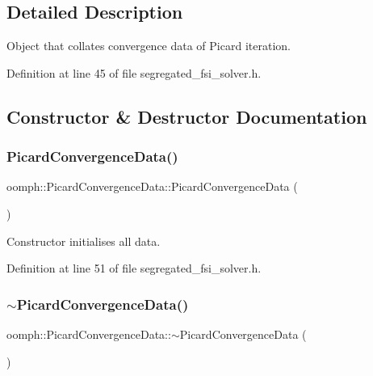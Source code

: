 \subsection{Detailed Description}
Object that collates convergence data of Picard iteration. 

Definition at line 45 of file segregated\+\_\+fsi\+\_\+solver.\+h.



\subsection{Constructor \& Destructor Documentation}
\mbox{\label{classoomph_1_1PicardConvergenceData_a48c244adc14b7d4d741f9083f277f779}} 
\subsubsection{\texorpdfstring{Picard\+Convergence\+Data()}{PicardConvergenceData()}}
{\footnotesize\ttfamily oomph\+::\+Picard\+Convergence\+Data\+::\+Picard\+Convergence\+Data (\begin{DoxyParamCaption}{ }\end{DoxyParamCaption})\hspace{0.3cm}{\ttfamily [inline]}}



Constructor initialises all data. 



Definition at line 51 of file segregated\+\_\+fsi\+\_\+solver.\+h.

\mbox{\label{classoomph_1_1PicardConvergenceData_a875840ce0db8db0409dd4356319f0c06}} 
\subsubsection{\texorpdfstring{$\sim$\+Picard\+Convergence\+Data()}{~PicardConvergenceData()}}
{\footnotesize\ttfamily oomph\+::\+Picard\+Convergence\+Data\+::$\sim$\+Picard\+Convergence\+Data (\begin{DoxyParamCaption}{ }\end{DoxyParamCaption})\hspace{0.3cm}{\ttfamily [inline]}}




